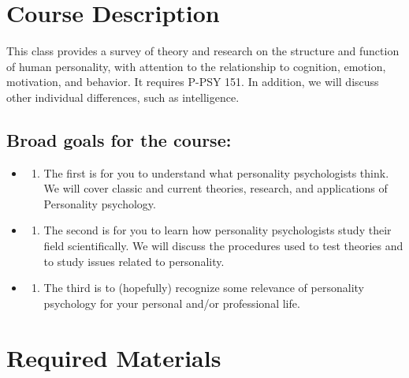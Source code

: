 \hypertarget{course-description}{%
\section*{Course Description}\label{course-description}}


This class provides a survey of theory and research on the structure and function of human personality, with attention to the relationship to cognition, emotion, motivation, and behavior. It requires P-PSY 151. In addition, we will discuss other individual differences, such as intelligence.

\hypertarget{broad-goals-for-the-course}{%
\subsection*{Broad goals for the course:}\label{broad-goals-for-the-course}}


\begin{itemize}
\item
  \begin{enumerate}
  \def\labelenumi{\arabic{enumi}.}
  \tightlist
  \item
    The first is for you to understand what personality psychologists think. We will cover classic and current theories, research, and applications of Personality psychology.
  \end{enumerate}
\item
  \begin{enumerate}
  \def\labelenumi{\arabic{enumi}.}
  \setcounter{enumi}{1}
  \tightlist
  \item
    The second is for you to learn how personality psychologists study their field scientifically. We will discuss the procedures used to test theories and to study issues related to personality.
  \end{enumerate}
\item
  \begin{enumerate}
  \def\labelenumi{\arabic{enumi}.}
  \setcounter{enumi}{2}
  \tightlist
  \item
    The third is to (hopefully) recognize some relevance of personality psychology for your personal and/or professional life.
  \end{enumerate}
\end{itemize}

\hypertarget{required-materials}{%
\section*{Required Materials}\label{required-materials}}


